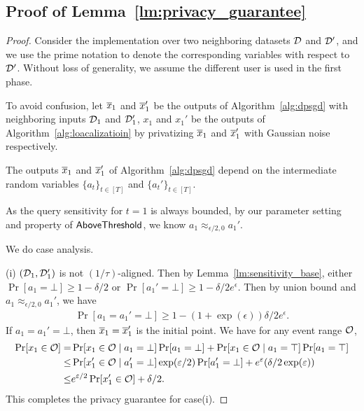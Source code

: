 \subsection{Proof of Lemma~\ref{lm:privacy_guarantee}}
\label{app:privacy-proof}
\privacyguarantee*
\begin{proof}
Consider the implementation over two neighboring datasets $\mathcal{D}$ and $\mathcal{D}'$, and we use the prime notation to denote the corresponding variables with respect to $\mathcal{D}'$.
Without loss of generality, we assume the different user is used in the first phase.

To avoid confusion, let $\overline{x}_1$ and $\overline{x}_1'$ be the outputs of Algorithm~\ref{alg:dpsgd} with neighboring inputs $\mathcal{D}_1$ and $\mathcal{D}_1'$, 
$x_1$ and $x_1'$ be the outputs of Algorithm~\ref{alg:loacalizatioin} by privatizing $\overline{x}_1$ and $\overline{x}_1'$ with Gaussian noise respectively.

The outputs $\overline{x}_1$ and $\overline{x}_1'$ of  Algorithm~\ref{alg:dpsgd} depend on the intermediate random variables $\{a_t\}_{t\in [T]}$ and $\{a_t'\}_{t\in[T]}$.

As the query sensitivity for $t=1$ is always bounded, by our parameter setting and property of $\mathsf{AboveThreshold}$, we know $a_1\approx_{\epsilon/2,0}a_1'$.

We do case analysis.

(i) $(\mathcal{D}_1,\mathcal{D}_1')$ is not $(1/\tau)$-aligned.
Then by Lemma~\ref{lm:sensitivity_base}, either $\Pr[a_1=\bot]\ge 1-\delta/2$ or $\Pr[a_1'=\bot]\ge 1-\delta/2e^{\epsilon}$.
Then by union bound and $a_1\approx_{\epsilon/2,0}a_1'$, we have
\begin{align*}
    \Pr[a_1=a_1'=\bot]\ge 1-(1+\exp(\epsilon))\delta/2e^{\epsilon}.
\end{align*}
If $a_1=a_1'=\bot$, then $\overline{x}_1=\overline{x}_1'$ is the initial point.
We have for any event range $\mathcal{O}$,
\begin{align*}
    \Pr[x_1\in \mathcal{O}] =&\Pr[x_1\in \mathcal{O}\mid a_1=\bot]\Pr[a_1=\bot]+\Pr[x_1\in\mathcal{O}\mid a_1=\top]\Pr[a_1=\top]\\
    \le & \Pr[x_1'\in\mathcal{O}\mid a_1'=\bot] \exp(\varepsilon/2)\Pr[a_1'=\bot]+ e^{\varepsilon}(\delta/2\exp(\varepsilon))\\
    \le & e^{\varepsilon/2}\Pr[x_1'\in\mathcal{O}]+ \delta/2.
\end{align*}
This completes the privacy guarantee for case(i).


\end{proof}
